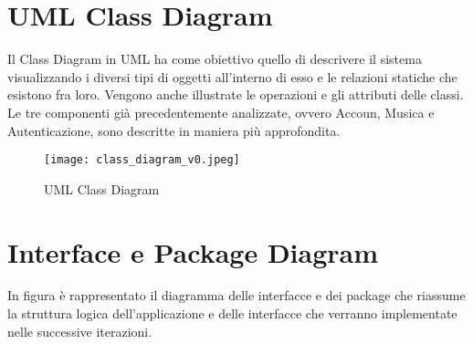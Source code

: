 \newpage
\section{UML Class Diagram}
Il Class Diagram in UML ha come obiettivo quello di descrivere il sistema 
visualizzando i diversi tipi di oggetti all'interno di esso e le relazioni 
statiche che esistono fra loro. Vengono anche illustrate le operazioni e 
gli attributi delle classi. 
Le tre componenti già precedentemente analizzate, ovvero Accoun, Musica e 
Autenticazione, sono descritte in maniera più approfondita.
\begin{figure}[H]
    \centering
    \texttt{[image: class\_diagram\_v0.jpeg]}
    \caption{UML Class Diagram}
    \label{fig-uml-class-diag}
\end{figure}


\newpage
\section{Interface e Package Diagram}
In figura è rappresentato il diagramma delle interfacce e dei package che riassume la struttura
logica dell'applicazione e delle interfacce che verranno implementate nelle successive iterazioni.
